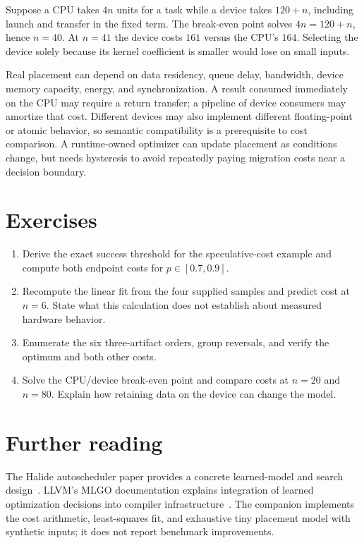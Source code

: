 Suppose a CPU takes $4n$ units for a task while a device takes $120+n$, including launch and transfer in the fixed term.
The break-even point solves $4n=120+n$, hence $n=40$.
At $n=41$ the device costs $161$ versus the CPU's $164$.
Selecting the device solely because its kernel coefficient is smaller would lose on small inputs.

Real placement can depend on data residency, queue delay, bandwidth, device memory capacity, energy, and synchronization.
A result consumed immediately on the CPU may require a return transfer; a pipeline of device consumers may amortize that cost.
Different devices may also implement different floating-point or atomic behavior, so semantic compatibility is a prerequisite to cost comparison.
A runtime-owned optimizer can update placement as conditions change, but needs hysteresis to avoid repeatedly paying migration costs near a decision boundary.

\section{Exercises}
\label{sec:ch68-exercises}

\begin{enumerate}
\item\label{ex:ch68-threshold} Derive the exact success threshold for the speculative-cost example and compute both endpoint costs for $p\in[0.7,0.9]$.
\item\label{ex:ch68-fit} Recompute the linear fit from the four supplied samples and predict cost at $n=6$.
State what this calculation does not establish about measured hardware behavior.
\item\label{ex:ch68-order} Enumerate the six three-artifact orders, group reversals, and verify the optimum and both other costs.
\item\label{ex:ch68-device} Solve the CPU/device break-even point and compare costs at $n=20$ and $n=80$.
Explain how retaining data on the device can change the model.
\end{enumerate}

\section{Further reading}
\label{sec:ch68-reading}

The Halide autoscheduler paper provides a concrete learned-model and search design~\cite{adams-2019-learning}.
LLVM's MLGO documentation explains integration of learned optimization decisions into compiler infrastructure~\cite{llvm-2026-mlgo}.
The companion implements the cost arithmetic, least-squares fit, and exhaustive tiny placement model with synthetic inputs; it does not report benchmark improvements.
